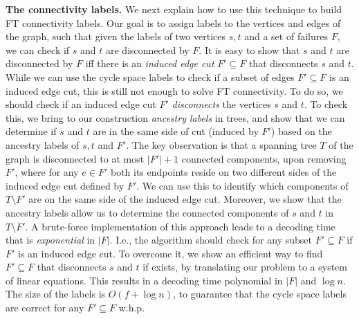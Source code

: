 \noindent\textbf{The connectivity labels.} We next explain how to use this technique to build FT connectivity labels. Our goal is to assign labels to the vertices and edges of the graph, such that given the labels of two vertices $s,t$ and a set of failures $F$, we can check if $s$ and $t$ are disconnected by $F$. It is easy to show that $s$ and $t$ are disconnected by $F$ iff there is an \emph{induced edge cut} $F' \subseteq F$ that disconnects $s$ and $t$. While we can use the cycle space labels to check if a subset of edges $F' \subseteq F$ is an induced edge cut, this is still not enough to solve FT connectivity. To do so, we should check if an induced edge cut $F'$ \emph{disconnects} the vertices $s$ and $t$. To check this, we bring to our construction \emph{ancestry labels} in trees, and show that we can determine if $s$ and $t$ are in the same side of cut (induced by $F'$) based on the ancestry labels of $s,t$ and $F'$. The key observation is that a spanning tree $T$ of the graph is disconnected to at most $|F'|+1$ connected components, upon removing $F'$, where for any $e \in F'$ both its endpoints reside on two different sides of the induced edge cut defined by $F'$.
We can use this to identify which components of $T \setminus F'$ are on the same side of the induced edge cut. Moreover, we show that the ancestry labels allow us to determine the connected components of $s$ and $t$ in $T \setminus F'$. A brute-force implementation of this approach leads to a decoding time that is \emph{exponential} in $|F|$. I.e., the algorithm should check for any subset $F' \subseteq F$ if $F'$ is an induced edge cut. To overcome it, we show an efficient way to find $F' \subseteq F$ that disconnects $s$ and $t$ if exists, by translating our problem to a system of linear equations. This results in a decoding time polynomial in $|F|$ and $\log{n}$. The size of the labels is $O(f+\log{n})$, to guarantee that the cycle space labels are correct for any $F' \subseteq F$ w.h.p.      

